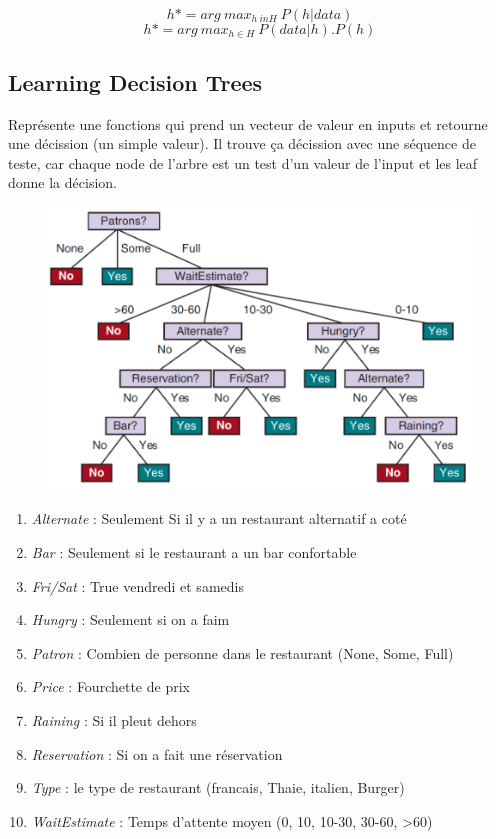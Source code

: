 \documentclass[12pt]{article}
\begin{document}
			\begin{equation}
				h* = arg \ max_{h\ in H} \ P(h|data)
			\end{equation}
			\begin{equation}
				h* = arg \ max_{h \in H} \ P(data|h).P(h)
			\end{equation}
			
	\subsection{Learning Decision Trees}
		Représente une fonctions qui prend un vecteur de valeur en inputs et retourne une décission (un simple valeur). Il trouve ça décission avec une séquence de teste, car chaque node de l'arbre est un test d'un valeur de l'input et les leaf donne la décision.
		
		\begin{figure}[H]
			\centering
			\includegraphics[width=.8\textwidth]{img/tree.png}
		\end{figure}
		
		\begin{enumerate}
			\item \textit{Alternate} : Seulement Si il y a un restaurant alternatif a coté
			\item \textit{Bar} : Seulement si le restaurant a un bar confortable
			\item \textit{Fri/Sat} : True vendredi et samedis
			\item \textit{Hungry} : Seulement si on a faim
			\item \textit{Patron} : Combien de personne dans le restaurant (None, Some, Full)
			\item \textit{Price} : Fourchette de prix
			\item \textit{Raining} : Si il pleut dehors
			\item \textit{Reservation} : Si on a fait une réservation
			\item \textit{Type} : le type de restaurant (francais, Thaie, italien, Burger)
			\item \textit{WaitEstimate} : Temps d'attente moyen (0, 10, 10-30, 30-60, >60)
		\end{enumerate}
		
\end{document}
